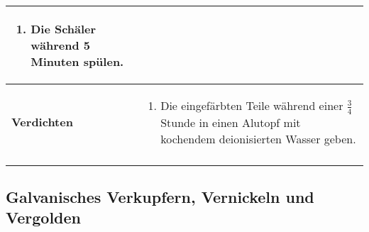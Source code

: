 \begin{longtable}{p{3cm}p{14cm}}
\begin{enumerate}
 				\item Die Schäler während 5 Minuten spülen.
 			\end{enumerate}\\
 	\hline
 	\textbf{Verdichten}
 		& 
 			\begin{enumerate}
 				\item Die eingefärbten Teile während einer $\frac{3}{4}$ Stunde in einen Alutopf mit kochendem deionisierten Wasser geben.
 			\end{enumerate}\\
 	\newpage
\end{longtable}

\subsection{Galvanisches Verkupfern, Vernickeln und Vergolden}
